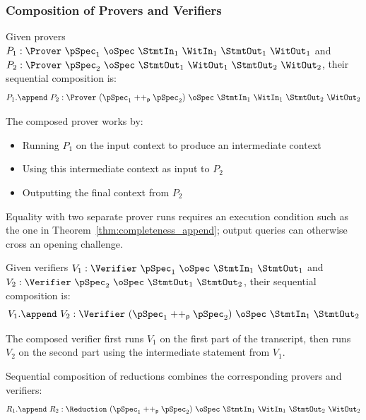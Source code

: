 \subsubsection{Composition of Provers and Verifiers}

\begin{definition}
    \label{def:prover_append}
    Given provers $P_1 : \Prover\ \pSpec_1\ \oSpec\ \StmtIn_1\ \WitIn_1\ \StmtOut_1\ \WitOut_1$ and $P_2 : \Prover\ \pSpec_2\ \oSpec\ \StmtOut_1\ \WitOut_1\ \StmtOut_2\ \WitOut_2$, their sequential composition is:
    \[ P_1.\append\ P_2 : \Prover\ (\pSpec_1 \mathrel{++_\mathsf{p}} \pSpec_2)\ \oSpec\ \StmtIn_1\ \WitIn_1\ \StmtOut_2\ \WitOut_2 \]

    The composed prover works by:
    \begin{itemize}
        \item Running $P_1$ on the input context to produce an intermediate context
        \item Using this intermediate context as input to $P_2$
        \item Outputting the final context from $P_2$
    \end{itemize}
    Equality with two separate prover runs requires an execution condition such as the one in
    Theorem~\ref{thm:completeness_append}; output queries can otherwise cross an opening challenge.
\end{definition}

\begin{definition}
    \label{def:verifier_append}
    Given verifiers $V_1 : \Verifier\ \pSpec_1\ \oSpec\ \StmtIn_1\ \StmtOut_1$ and $V_2 : \Verifier\ \pSpec_2\ \oSpec\ \StmtOut_1\ \StmtOut_2$, their sequential composition is:
    \[ V_1.\append\ V_2 : \Verifier\ (\pSpec_1 \mathrel{++_\mathsf{p}} \pSpec_2)\ \oSpec\ \StmtIn_1\ \StmtOut_2 \]

    The composed verifier first runs $V_1$ on the first part of the transcript, then runs $V_2$ on the second part using the intermediate statement from $V_1$.
\end{definition}

\begin{definition}
    \label{def:reduction_append}
    Sequential composition of reductions combines the corresponding provers and verifiers:
    \[ R_1.\append\ R_2 : \Reduction\ (\pSpec_1 \mathrel{++_\mathsf{p}} \pSpec_2)\ \oSpec\ \StmtIn_1\ \WitIn_1\ \StmtOut_2\ \WitOut_2 \]
\end{definition}

